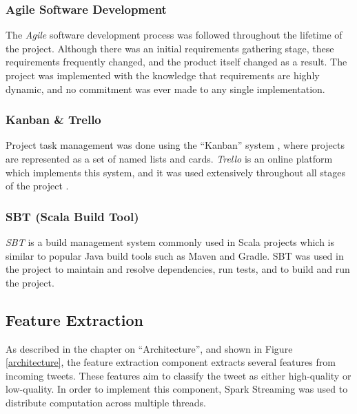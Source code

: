 \documentclass{l4proj}
\begin{document}
             \subsubsection{Agile Software Development}
             The \textit{Agile} software development process was followed throughout the lifetime of the project. Although there was an initial requirements gathering stage, these requirements frequently changed, and the product itself changed as a result. The project was implemented with the knowledge that requirements are highly dynamic, and no commitment was ever made to any single implementation.
             
             
             \subsubsection{Kanban \& Trello}
             Project task management was done using the ``Kanban'' system \cite{kanban}, where projects are represented as a set of named lists and cards. \textit{Trello} is an online platform which implements this system, and it was used extensively throughout all stages of the project \cite{trello}.
         
             \subsubsection{SBT (Scala Build Tool)}
         \textit{SBT} is a build management system commonly used in Scala projects \cite{sbt} which is similar to popular Java build tools such as Maven and Gradle. SBT was used in the project to maintain and resolve dependencies, run tests, and to build and run the project.

    
    
    \subsection{Feature Extraction}
        
        As described in the chapter on ``Architecture'', and shown in Figure \ref{architecture}, the feature extraction component extracts several features from incoming tweets. These features aim to classify the tweet as either high-quality or low-quality. In order to implement this component, Spark Streaming was used to distribute computation across multiple threads.
        
\end{document}
